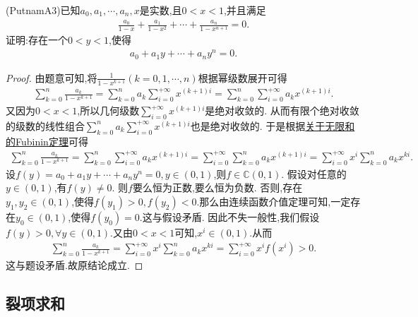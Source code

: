 \documentclass[../../main.tex]{subfiles}%
\begin{document}
\begin{example}
(PutnamA3)已知\(a_0, a_1, \cdots, a_n, x\)是实数,且\(0 < x < 1\),并且满足
\begin{align*}
\frac{a_0}{1 - x}+\frac{a_1}{1 - x^2}+\cdots+\frac{a_n}{1 - x^{n + 1}} = 0.
\nonumber
\end{align*}
证明:存在一个\(0 < y < 1\),使得
\begin{align*}
a_0 + a_1y + \cdots + a_ny^n = 0.
\nonumber
\end{align*}
\end{example}

\begin{proof}
由题意可知,将$\frac{1}{1-x^{k+1}}\left( k=0,1,\cdots ,n \right)$根据幂级数展开可得
\begin{align*}
\sum\limits_{k=0}^n{\frac{a_k}{1-x^{k+1}}}=\sum\limits_{k=0}^n{a_k\sum\limits_{i=0}^{+\infty}{x^{\left( k+1 \right) i}}}=\sum\limits_{k=0}^n{\sum\limits_{i=0}^{+\infty}{a_kx^{\left( k+1 \right) i}}}.
\nonumber
\end{align*}
又因为$0<x<1$,所以几何级数$\sum\limits_{i=0}^{+\infty}{x^{\left( k+1 \right) i}}$是绝对收敛的.
从而有限个绝对收敛的级数的线性组合$\sum\limits_{k=0}^n{a_k\sum\limits_{i=0}^{+\infty}{x^{\left( k+1 \right) i}}}$也是绝对收敛的.
于是根据\hyperlink{关于无限和的Fubinin定理}{关于无限和的Fubinin定理}可得
\begin{align*}
\sum\limits_{k=0}^n{\frac{a_k}{1-x^{k+1}}}=\sum\limits_{k=0}^n{\sum\limits_{i=0}^{+\infty}{a_kx^{\left( k+1 \right) i}}}=\sum\limits_{i=0}^{+\infty}{\sum\limits_{k=0}^n{a_kx^{\left( k+1 \right) i}}}=\sum\limits_{i=0}^{+\infty}{x^i\sum\limits_{k=0}^n{a_kx^{ki}}}.
\nonumber
\end{align*}
设$f(y)=a_0 + a_1y + \cdots + a_ny^n = 0,y\in(0,1)$,则$f\in \mathbb{C}(0,1)$.
假设对任意的$y\in(0,1)$,有$f(y)\ne0$.
则$f$要么恒为正数,要么恒为负数.
否则,存在$y_1,y_2\in(0,1)$,使得$f(y_1)>0,f(y_2)<0$.那么由连续函数介值定理可知,一定存在$y_0\in(0,1)$,使得$f(y_0)=0$.这与假设矛盾.
因此不失一般性,我们假设$f(y)>0,\forall y\in (0,1)$.又由$0<x<1$可知,$x^i\in(0,1)$.从而
\begin{align*}
\sum\limits_{k=0}^n{\frac{a_k}{1-x^{k+1}}}=\sum\limits_{i=0}^{+\infty}{x^i\sum\limits_{k=0}^n{a_kx^{ki}}=}\sum\limits_{i=0}^{+\infty}{x^if\left( x^i \right)}>0.
\nonumber
\end{align*}
这与题设矛盾.故原结论成立.
\end{proof}

\subsection{裂项求和}
\end{document}
